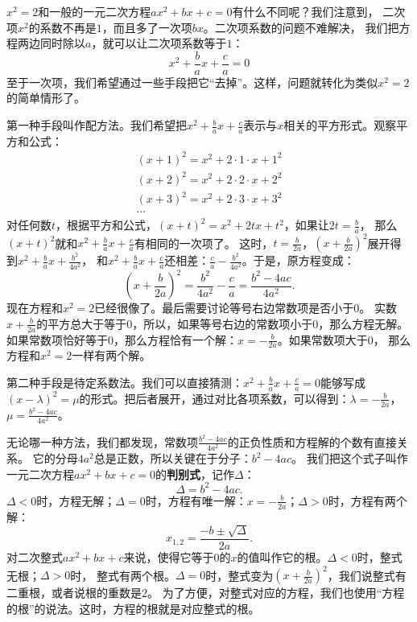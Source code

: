 \documentclass[12pt,UTF8]{ctexbook}
\begin{document}
$x^2 = 2$和一般的一元二次方程$ax^2 + bx + c = 0$有什么不同呢？我们注意到，
二次项$x^2$的系数不再是$1$，而且多了一次项$bx$。二次项系数的问题不难解决，
我们把方程两边同时除以$a$，就可以让二次项系数等于$1$：
$$ x^2 + \frac{b}{a} x + \frac{c}{a} = 0$$
至于一次项，我们希望通过一些手段把它“去掉”。这样，问题就转化为类似$x^2 = 2$的简单情形了。

第一种手段叫作配方法。我们希望把$x^2 + \frac{b}{a}x + \frac{c}{a}$表示与$x$相关的平方形式。观察平方和公式：
\begin{align*}
    (x + 1)^2 = x^2 + 2\cdot 1\cdot x + 1^2  \\
    (x + 2)^2 = x^2 + 2\cdot 2\cdot x + 2^2  \\
    (x + 3)^2 = x^2 + 2\cdot 3\cdot x + 3^2  \\
    \cdots 
\end{align*}
对任何数$t$，根据平方和公式，$(x + t)^2 = x^2 + 2tx + t^2$，如果让$2t = \frac{b}{a}$，
那么$(x + t)^2$就和$x^2 + \frac{b}{a}x + \frac{c}{a}$有相同的一次项了。
这时，$t = \frac{b}{2a}$，$(x + \frac{b}{2a})^2$展开得到$x^2 + \frac{b}{a}x + \frac{b^2}{4a^2} $，
和$x^2 + \frac{b}{a}x + \frac{c}{a}$还相差：$\frac{c}{a} - \frac{b^2}{4a^2}$。于是，原方程变成：
$$ (x + \frac{b}{2a})^2 = \frac{b^2}{4a^2} - \frac{c}{a} = \frac{b^2 - 4ac}{4a^2}.$$
现在方程和$x^2 = 2$已经很像了。最后需要讨论等号右边常数项是否小于$0$。
实数$x + \frac{b}{2a}$的平方总大于等于$0$，所以，如果等号右边的常数项小于$0$，那么方程无解。
如果常数项恰好等于$0$，那么方程恰有一个解：$x = -\frac{b}{2a}$。如果常数项大于$0$，
那么方程和$x^2 = 2$一样有两个解。

第二种手段是待定系数法。我们可以直接猜测：$x^2 + \frac{b}{a} x + \frac{c}{a} = 0$能够写成
$(x - \lambda)^2 = \mu$的形式。把后者展开，通过对比各项系数，可以得到：$\lambda = -\frac{b}{2a}$，
$\mu = \frac{b^2 - 4ac}{4a^2}$。

无论哪一种方法，我们都发现，常数项$\frac{b^2 - 4ac}{4a^2}$的正负性质和方程解的个数有直接关系。
它的分母$4a^2$总是正数，所以关键在于分子：$b^2 - 4ac$。
我们把这个式子叫作一元二次方程$ax^2 + bx + c = 0$的\textbf{判别式}，记作$\Delta$：
$$\Delta = b^2 - 4ac.$$
$\Delta<0$时，方程无解；$\Delta = 0$时，方程有唯一解：$x = -\frac{b}{2a}$；$\Delta>0$时，方程有两个解：
$$x_{1,2} = \frac{-b \pm \sqrt{\Delta}}{2a}.$$
对二次整式$ax^2 + bx + c$来说，使得它等于$0$的$x$的值叫作它的根。$\Delta<0$时，整式无根；$\Delta>0$时，
整式有两个根。$\Delta = 0$时，整式变为$(x + \frac{b}{2a})^2$，我们说整式有二重根，或者说根的重数是$2$。
为了方便，对整式对应的方程，我们也使用“方程的根”的说法。这时，方程的根就是对应整式的根。
\end{document}

